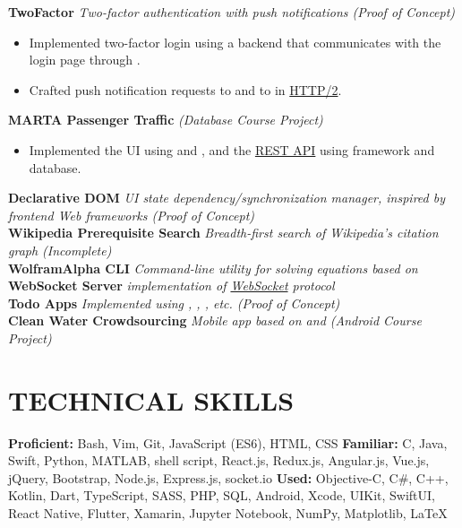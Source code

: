 \documentclass[11pt]{article}
\begin{document}
\vspace{0.5em}
%
\textbf{TwoFactor} \enspace \textit{Two-factor authentication with push notifications (Proof of Concept)}
\begin{itemize}[leftmargin=15pt, noitemsep, topsep=0pt]
\item Implemented two-factor login using a \underline{} backend that communicates with the login page through \underline{}.
\item Crafted push notification requests to \underline{} and to \underline{} in \underline{HTTP/2}.
\end{itemize}
\vspace{0.5em}
%
\textbf{MARTA Passenger Traffic} \enspace \textit{(Database Course Project)}
\begin{itemize}[leftmargin=15pt, noitemsep, topsep=0pt]
\item Implemented the UI using \underline{} and \underline{}, and the \underline{REST API} using \underline{} framework and \underline{} database.
\end{itemize}
\vspace{0.5em}
%
\textbf{Declarative DOM} \enspace \textit{UI state dependency/synchronization manager, inspired by frontend Web frameworks (Proof of Concept)}\\
\textbf{Wikipedia Prerequisite Search} \enspace \textit{Breadth-first search of Wikipedia's citation graph (Incomplete)}\\
\textbf{WolframAlpha CLI} \enspace \textit{Command-line utility for solving equations based on \underline{}}\\
\textbf{WebSocket Server}  \enspace \textit{\underline{} implementation of \underline{WebSocket} protocol}\\
\textbf{Todo Apps} \enspace \textit{Implemented using \underline{}\underline{}, \underline{}, \underline{}, etc. (Proof of Concept)}\\
\textbf{Clean Water Crowdsourcing}	\enspace \textit{Mobile app based on \underline{} and \underline{} (Android Course Project) }
\vspace{-0.5em}

\section*{TECHNICAL SKILLS}
\textbf{Proficient:} Bash, Vim, Git, JavaScript (ES6), HTML, CSS  \enspace\textbf{Familiar:} C, Java, Swift, Python, MATLAB, shell script, React.js, Redux.js, Angular.js, Vue.js, jQuery, Bootstrap, Node.js, Express.js, socket.io \enspace\textbf{Used:} Objective-C, C\#, C++, Kotlin, Dart, TypeScript, SASS,  PHP, SQL, Android, Xcode, UIKit, SwiftUI, React Native, Flutter, Xamarin, Jupyter Notebook, NumPy, Matplotlib, LaTeX
\end{document}
